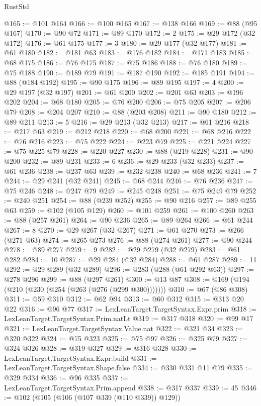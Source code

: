 \begin{lexlean}{RustStd}
\begin{coremodule}
@165 := @101 @164
@166 := @100 @165
@167 := @138 @166
@169 := @88 (@95 @167)
@170 := @90 @72
@171 := @89 @170
@172 := 2
@175 := @29 @172 (@32 @172)
@176 := @61 @175
@177 := 3
@180 := @29 @177 (@32 @177)
@181 := @61 @180
@182 := @181 @63
@183 := @176 @182
@184 := @171 @183
@185 := @68 @175
@186 := @76 @175
@187 := @75 @186
@188 := @76 @180
@189 := @75 @188
@190 := @189 @79
@191 := @187 @190
@192 := @185 @191
@194 := @88 (@184 @192)
@195 := @90 @175
@196 := @89 @195
@197 := 4
@200 := @29 @197 (@32 @197)
@201 := @61 @200
@202 := @201 @63
@203 := @196 @202
@204 := @68 @180
@205 := @76 @200
@206 := @75 @205
@207 := @206 @79
@208 := @204 @207
@210 := @88 (@203 @208)
@211 := @90 @180
@212 := @89 @211
@213 := 5
@216 := @29 @213 (@32 @213)
@217 := @61 @216
@218 := @217 @63
@219 := @212 @218
@220 := @68 @200
@221 := @68 @216
@222 := @76 @216
@223 := @75 @222
@224 := @223 @79
@225 := @221 @224
@227 := @75 @225 @79
@228 := @220 @227
@230 := @88 (@219 @228)
@231 := @90 @200
@232 := @89 @231
@233 := 6
@236 := @29 @233 (@32 @233)
@237 := @61 @236
@238 := @237 @63
@239 := @232 @238
@240 := @68 @236
@241 := 7
@244 := @29 @241 (@32 @241)
@245 := @68 @244
@246 := @76 @236
@247 := @75 @246
@248 := @247 @79
@249 := @245 @248
@251 := @75 @249 @79
@252 := @240 @251
@254 := @88 (@239 @252)
@255 := @90 @216
@257 := @89 @255 @63
@259 := @102 (@105 @129)
@260 := @101 @259
@261 := @100 @260
@263 := @88 (@257 @261)
@264 := @90 @236
@265 := @89 @264
@266 := @61 @244
@267 := 8
@270 := @29 @267 (@32 @267)
@271 := @61 @270
@273 := @266 (@271 @63)
@274 := @265 @273
@276 := @88 (@274 @261)
@277 := @90 @244
@278 := @89 @277
@279 := 9
@282 := @29 @279 (@32 @279)
@283 := @61 @282
@284 := 10
@287 := @29 @284 (@32 @284)
@288 := @61 @287
@289 := 11
@292 := @29 @289 (@32 @289)
@296 := @283 (@288 (@61 @292 @63))
@297 := @278 @296
@299 := @88 (@297 @261)
@300 := @13 @87
@308 := @169 (@194 (@210 (@230 (@254 (@263 (@276 (@299 @300)))))))
@310 := @67 (@86 @308)
@311 := @59 @310
@312 := @62 @94
@313 := @60 @312
@315 := @313 @20 @22
@316 := @96 @77
@317 := LexLeanTarget.TargetSyntax.Expr.prim
@318 := LexLeanTarget.TargetSyntax.Prim.natLt
@319 := @317 @318
@320 := @99 @17
@321 := LexLeanTarget.TargetSyntax.Value.nat
@322 := @321 @34
@323 := @320 @322
@324 := @75 @323
@325 := @75 @97
@326 := @325 @79
@327 := @324 @326
@328 := @319 @327
@329 := @316 @328
@330 := LexLeanTarget.TargetSyntax.Expr.build
@331 := LexLeanTarget.TargetSyntax.Shape.false
@334 := @330 @331 @11 @79
@335 := @329 @334
@336 := @96 @335
@337 := LexLeanTarget.TargetSyntax.Prim.append
@338 := @317 @337
@339 := 45
@346 := @102 (@105 (@106 (@107 @339 (@110 @339)) @129))

\end{coremodule}
\end{lexlean}
